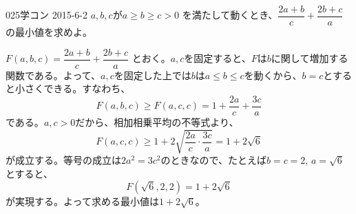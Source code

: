 \begin{thm}{025}{}{学コン 2015-6-2}
 $a,b,c$が$a \ge b \ge c > 0$ を満たして動くとき、$\dfrac{2a+b}{c}+\dfrac{2b+c}{a}$の最小値を求めよ。
\end{thm}

$F(a, b, c)=\dfrac{2a+b}{c}+\dfrac{2b+c}{a}$ とおく。$a, c$を固定すると、$F$は$b$に関して増加する関数である。よって、$a, c$を固定した上では$b$は$a\le b\le c$を動くから、$b=c$とすると小さくできる。すなわち、
\[ F(a, b, c)\ge F(a, c, c)=1+\frac{2a}{c}+\frac{3c}{a} \]
である。$a, c>0$だから、相加相乗平均の不等式より、
\[ F(a, c, c)\ge 1+2\sqrt{\frac{2a}{c}\cdot\frac{3c}{a}}=1+2\sqrt{6} \]
が成立する。等号の成立は$2a^2=3c^2$のときなので、たとえば$b=c=2$, $a=\sqrt{6}$とすると、
\[ F(\sqrt{6}, 2, 2)=1+2\sqrt{6} \]
が実現する。よって求める最小値は$1+2\sqrt{6}$。